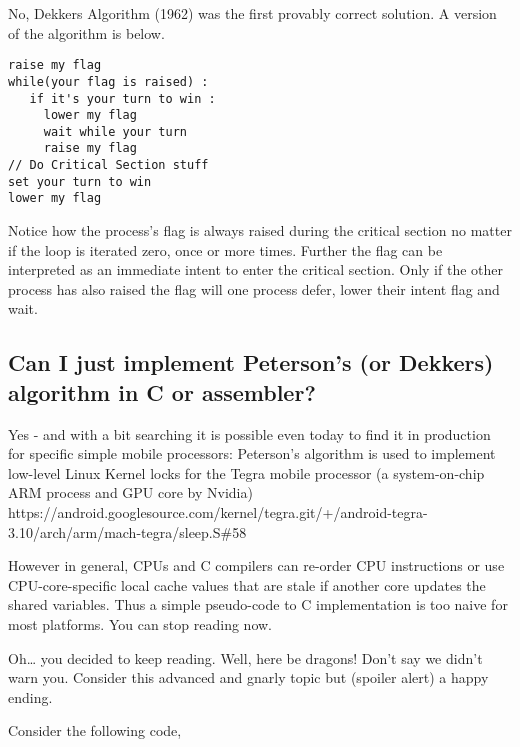 No, Dekkers Algorithm (1962) was the first provably correct solution. A
version of the algorithm is below.

\begin{verbatim}
raise my flag
while(your flag is raised) :
   if it's your turn to win :
     lower my flag
     wait while your turn
     raise my flag
// Do Critical Section stuff
set your turn to win
lower my flag
\end{verbatim}

Notice how the process's flag is always raised during the critical
section no matter if the loop is iterated zero, once or more times.
Further the flag can be interpreted as an immediate intent to enter the
critical section. Only if the other process has also raised the flag
will one process defer, lower their intent flag and wait.

\subsection{Can I just implement Peterson's (or Dekkers) algorithm in C
or
assembler?}\label{can-i-just-implement-petersons-or-dekkers-algorithm-in-c-or-assembler}

Yes - and with a bit searching it is possible even today to find it in
production for specific simple mobile processors: Peterson's algorithm
is used to implement low-level Linux Kernel locks for the Tegra mobile
processor (a system-on-chip ARM process and GPU core by Nvidia)
https://android.googlesource.com/kernel/tegra.git/+/android-tegra-3.10/arch/arm/mach-tegra/sleep.S\#58

However in general, CPUs and C compilers can re-order CPU instructions
or use CPU-core-specific local cache values that are stale if another
core updates the shared variables. Thus a simple pseudo-code to C
implementation is too naive for most platforms. You can stop reading
now.

Oh\ldots{} you decided to keep reading. Well, here be dragons! Don't say
we didn't warn you. Consider this advanced and gnarly topic but (spoiler
alert) a happy ending.

Consider the following code,

\begin{Shaded}
\begin{Highlighting}[]
\end{Highlighting}
\end{Shaded}

